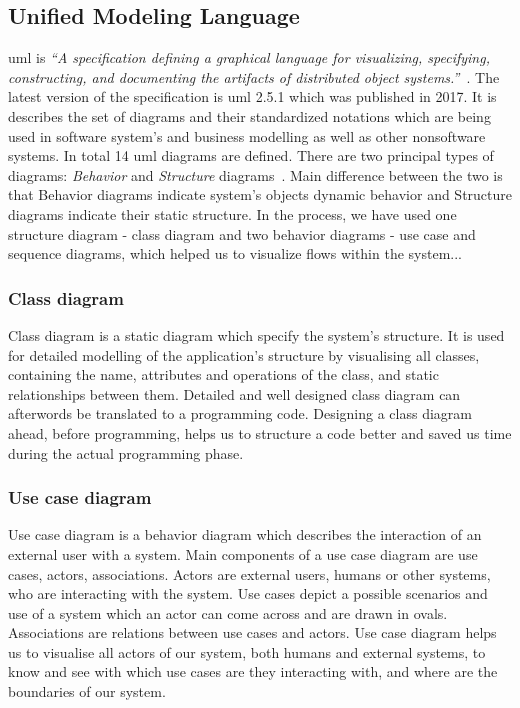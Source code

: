\subsection{Unified Modeling Language}
\acrfull{uml} is \textit{``A specification defining a graphical language for visualizing, specifying, constructing, and documenting the artifacts of distributed object systems.''}~\cite{OMG2017About2.5.1}. The latest version of the specification is \acrshort{uml} 2.5.1 which was published in 2017. It is describes the set of diagrams and their standardized notations which are being used in software system's and business modelling as well as other nonsoftware  systems. In total 14 \acrshort{uml} diagrams are defined. There are two principal types of diagrams: \textit{Behavior} and \textit{Structure} diagrams~\cite{ObjectManagementGroup2015Unified2.5}. Main difference between the two is that Behavior diagrams indicate system's objects dynamic behavior and Structure diagrams indicate their static structure. In the process, we have used one structure diagram - class diagram and two behavior diagrams - use case and sequence diagrams, which helped us to visualize flows within the system...

\subsubsection{Class diagram}
Class diagram is a static diagram which specify the system's structure. It is used for detailed modelling of the application's structure by visualising all classes, containing the name, attributes and operations of the class, and static relationships between them. Detailed and well designed class diagram can afterwords be translated to a programming code. Designing a class diagram ahead, before programming, helps us to structure a code better and saved us time during the actual programming phase.

\subsubsection{Use case diagram}
Use case diagram is a behavior diagram which describes the interaction of an external user with a system. Main components of a use case diagram are use cases, actors, associations. Actors are external users, humans or other systems, who are interacting with the system. Use cases depict a possible scenarios and use of a system which an actor can come across and are drawn in ovals. Associations are relations between use cases and actors. Use case diagram helps us to visualise all actors of our system, both humans and external systems, to know and see with which use cases are they interacting with, and where are the boundaries of our system.

